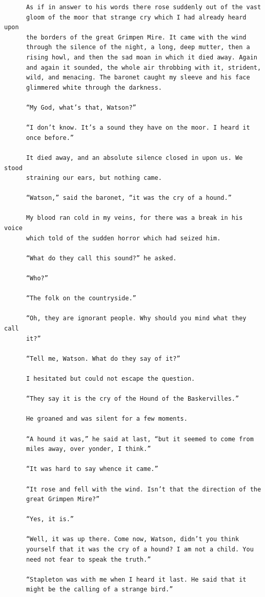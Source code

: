 \documentclass{article}
\begin{document}
\begin{verbatim}
      As if in answer to his words there rose suddenly out of the vast
      gloom of the moor that strange cry which I had already heard upon
      the borders of the great Grimpen Mire. It came with the wind
      through the silence of the night, a long, deep mutter, then a
      rising howl, and then the sad moan in which it died away. Again
      and again it sounded, the whole air throbbing with it, strident,
      wild, and menacing. The baronet caught my sleeve and his face
      glimmered white through the darkness.

      “My God, what’s that, Watson?”

      “I don’t know. It’s a sound they have on the moor. I heard it
      once before.”

      It died away, and an absolute silence closed in upon us. We stood
      straining our ears, but nothing came.

      “Watson,” said the baronet, “it was the cry of a hound.”

      My blood ran cold in my veins, for there was a break in his voice
      which told of the sudden horror which had seized him.

      “What do they call this sound?” he asked.

      “Who?”

      “The folk on the countryside.”

      “Oh, they are ignorant people. Why should you mind what they call
      it?”

      “Tell me, Watson. What do they say of it?”

      I hesitated but could not escape the question.

      “They say it is the cry of the Hound of the Baskervilles.”

      He groaned and was silent for a few moments.

      “A hound it was,” he said at last, “but it seemed to come from
      miles away, over yonder, I think.”

      “It was hard to say whence it came.”

      “It rose and fell with the wind. Isn’t that the direction of the
      great Grimpen Mire?”

      “Yes, it is.”

      “Well, it was up there. Come now, Watson, didn’t you think
      yourself that it was the cry of a hound? I am not a child. You
      need not fear to speak the truth.”

      “Stapleton was with me when I heard it last. He said that it
      might be the calling of a strange bird.”


\end{verbatim}
\end{document}
